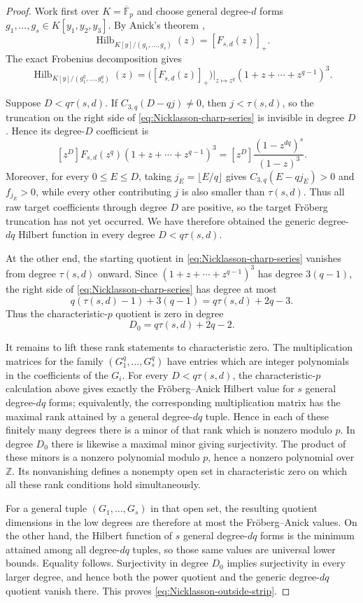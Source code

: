 \documentclass[11pt]{amsart}
\theoremstyle{remark}
\newcommand{\Hilb}{\operatorname{Hilb}}
\begin{document}
\begin{proof}
Work first over $K=\overline{\mathbb F}_p$ and choose general degree-$d$ forms $g_1,\ldots,g_s\in K[y_1,y_2,y_3]$. By Anick's theorem \cite{Anick},
$$
\Hilb_{K[y]/(g_1,\ldots,g_s)}(z)
=
[F_{s,d}(z)]_+.
$$
The exact Frobenius decomposition gives
\begin{equation}\label{eq:Nicklasson-charp-series}
\Hilb_{K[y]/(g_1^q,\ldots,g_s^q)}(z)
=
\bigl([F_{s,d}(z)]_+\bigr)\big|_{z\mapsto z^q}
(1+z+\cdots+z^{q-1})^3.
\end{equation}

Suppose $D<q\tau(s,d)$. If $C_{3,q}(D-qj)\ne0$, then $j<\tau(s,d)$, so the truncation on the right side of \eqref{eq:Nicklasson-charp-series} is invisible in degree $D$. Hence its degree-$D$ coefficient is
$$
[z^D]F_{s,d}(z^q)(1+z+\cdots+z^{q-1})^3
=
[z^D]\frac{(1-z^{dq})^s}{(1-z)^3}.
$$
Moreover, for every $0\le E\le D$, taking $j_E=\lfloor E/q\rfloor$ gives $C_{3,q}(E-qj_E)>0$ and $f_{j_E}>0$, while every other contributing $j$ is also smaller than $\tau(s,d)$. Thus all raw target coefficients through degree $D$ are positive, so the target Fr\"oberg truncation has not yet occurred. We have therefore obtained the generic degree-$dq$ Hilbert function in every degree $D<q\tau(s,d)$.

At the other end, the starting quotient in \eqref{eq:Nicklasson-charp-series} vanishes from degree $\tau(s,d)$ onward. Since $(1+z+\cdots+z^{q-1})^3$ has degree $3(q-1)$, the right side of \eqref{eq:Nicklasson-charp-series} has degree at most
$$
q(\tau(s,d)-1)+3(q-1)
=
q\tau(s,d)+2q-3.
$$
Thus the characteristic-$p$ quotient is zero in degree
$$
D_0=q\tau(s,d)+2q-2.
$$

It remains to lift these rank statements to characteristic zero. The multiplication matrices for the family $(G_1^q,\ldots,G_s^q)$ have entries which are integer polynomials in the coefficients of the $G_i$. For every $D<q\tau(s,d)$, the characteristic-$p$ calculation above gives exactly the Fr\"oberg--Anick Hilbert value for $s$ general degree-$dq$ forms; equivalently, the corresponding multiplication matrix has the maximal rank attained by a general degree-$dq$ tuple. Hence in each of these finitely many degrees there is a minor of that rank which is nonzero modulo $p$. In degree $D_0$ there is likewise a maximal minor giving surjectivity. The product of these minors is a nonzero polynomial modulo $p$, hence a nonzero polynomial over $\mathbb Z$. Its nonvanishing defines a nonempty open set in characteristic zero on which all these rank conditions hold simultaneously.

For a general tuple $(G_1,\ldots,G_s)$ in that open set, the resulting quotient dimensions in the low degrees are therefore at most the Fr\"oberg--Anick values. On the other hand, the Hilbert function of $s$ general degree-$dq$ forms is the minimum attained among all degree-$dq$ tuples, so those same values are universal lower bounds. Equality follows. Surjectivity in degree $D_0$ implies surjectivity in every larger degree, and hence both the power quotient and the generic degree-$dq$ quotient vanish there. This proves \eqref{eq:Nicklasson-outside-strip}.
\end{proof}
\end{document}
